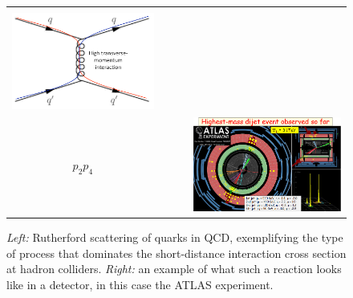 \begin{figure}[t]
\center
\begin{tabular}{ccc}
\begin{minipage}[c]{5.5cm}
$p_1$\hfill $p_3$\\[-1mm]
\includegraphics*[scale=0.5]{rutherford}\\[-4.5mm]
$p_2$\hfill $p_4$
\end{minipage}
& ~~~&
\begin{minipage}[c]{7cm}
\includegraphics*[scale=0.3]{dijet-atlas.png}
\end{minipage}
\end{tabular}
\caption{{\sl Left:} Rutherford scattering of quarks in QCD,
  exemplifying the type 
  of process that dominates the short-distance interaction cross section at
  hadron colliders. {\sl Right:} an example of what such a reaction
  looks like in a detector, in this case the ATLAS experiment.
\label{fig:rutherford} }
\end{figure}
